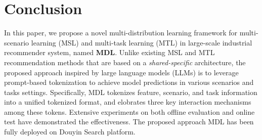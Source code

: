 \documentclass[sigconf]{acmart}
\begin{document}






\section{Conclusion}
\label{sec-con}
In this paper, we propose a novel multi-distribution learning framework for multi-scenario learning (MSL) and multi-task learning (MTL) in large-scale industrial recommender system, named \textbf{MDL}.
Unlike existing MSL and MTL recommendation methods that are based on a \emph{shared-specific} architecture, the proposed approach inspired by large language models (LLMs) is to leverage prompt-based tokenization to achieve model predictions in various scenarios and tasks settings.
Specifically, MDL tokenizes feature, scenario, and task information into a unified tokenized format, and elobrates three key interaction mechanisms among these tokens.
Extensive experiments on both offline evaluation and online test have demonstrated the effectiveness.
The proposed approach MDL has been fully deployed on Douyin Search platform.

\balance


\end{document}
